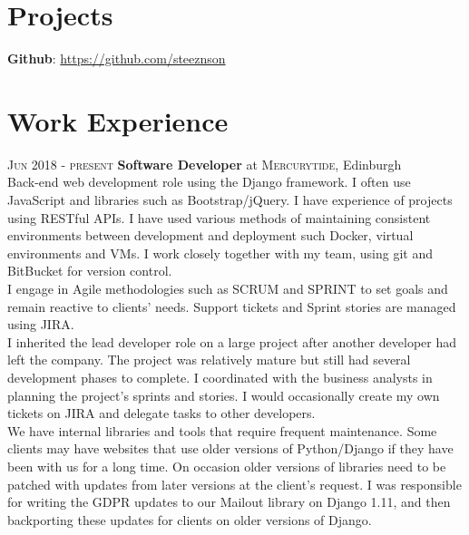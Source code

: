 \documentclass[14pt, a4paper]{extarticle}
\begin{document}
\begin{multicols}{2}
\section{Projects}
\noindent\textbf{Github}: \url{https://github.com/steeznson}

\columnbreak
\section{Work Experience}
\noindent\textsc{Jun 2018 - present} \textbf{Software Developer}
at \textsc{Mercurytide}, Edinburgh\\
Back-end web development role using the Django framework. I often use JavaScript and libraries such as Bootstrap/jQuery. I have experience of projects using RESTful APIs. I have used various methods of maintaining consistent environments between development and deployment such Docker, virtual environments and VMs. I work closely together with my team, using git and BitBucket for version control.\\
I engage in Agile methodologies such as SCRUM and SPRINT to set goals and remain reactive to clients' needs. Support tickets and Sprint stories are managed using JIRA.\\
I inherited the lead developer role on a large project after another developer had left the company. The project was relatively mature but still had several development phases to complete. I coordinated with the business analysts in planning the project's sprints and stories. I would occasionally create my own tickets on JIRA and delegate tasks to other developers.\\
We have internal libraries and tools that require frequent maintenance. Some clients may have websites that use older versions of Python/Django if they have been with us for a long time. On occasion older versions of libraries need to be patched with updates from later versions at the client's request. I was responsible for writing the GDPR updates to our Mailout library on Django 1.11, and then backporting these updates for clients on older versions of Django.
\end{multicols}
\end{document}
